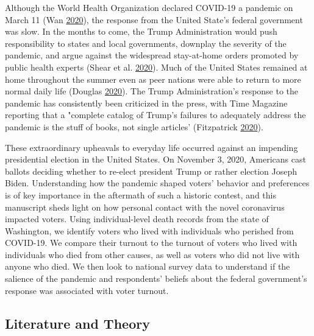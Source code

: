 \documentclass[
  12pt,
]{article}
\begin{document}
Although the World Health Organization declared COVID-19 a pandemic on March 11 (Wan \protect\hyperlink{ref-Wan2020}{2020}), the response from the United State's federal government was slow. In the months to come, the Trump Administration would push responsibility to states and local governments, downplay the severity of the pandemic, and argue against the widespread stay-at-home orders promoted by public health experts (Shear et al. \protect\hyperlink{ref-Shear2020}{2020}). Much of the United States remained at home throughout the summer even as peer nations were able to return to more normal daily life (Douglas \protect\hyperlink{ref-Douglas2020}{2020}). The Trump Administration's response to the pandemic has consistently been criticized in the press, with Time Magazine reporting that a "complete catalog of Trump's failures to adequately address the pandemic is the stuff of books, not single articles' (Fitzpatrick \protect\hyperlink{ref-Fitzpatrick2020}{2020}).

These extraordinary upheavals to everyday life occurred against an impending presidential election in the United States. On November 3, 2020, Americans cast ballots deciding whether to re-elect president Trump or rather election Joseph Biden. Understanding how the pandemic shaped voters' behavior and preferences is of key importance in the aftermath of such a historic contest, and this manuscript sheds light on how personal contact with the novel coronavirus impacted voters. Using individual-level death records from the state of Washington, we identify voters who lived with individuals who perished from COVID-19. We compare their turnout to the turnout of voters who lived with individuals who died from other causes, as well as voters who did not live with anyone who died. We then look to national survey data to understand if the salience of the pandemic and respondents' beliefs about the federal government's response was associated with voter turnout.

\hypertarget{literature-and-theory}{%
\subsection*{Literature and Theory}\label{literature-and-theory}}
\end{document}
